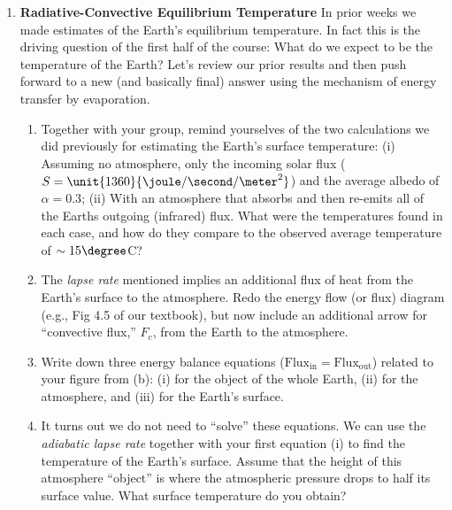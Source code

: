 \documentclass[12pt]{article}
\begin{document}
\begin{enumerate}
\item {\bf Radiative-Convective Equilibrium Temperature} In prior weeks we made estimates of the Earth's equilibrium temperature.  In fact this is the driving question of the first half of the course: What do we expect to be the temperature of the Earth?  Let's review our prior results and then push forward to a new (and basically final) answer using the mechanism of energy transfer by evaporation.
	\begin{enumerate}
	\item Together with your group, remind yourselves of the two calculations we did previously for estimating the Earth's surface temperature: (i) Assuming no atmosphere, only the incoming solar flux ($S = \unit{1360}{\joule/\second/\meter^2}$) and the average albedo of $\alpha=0.3$; (ii) With an atmosphere that absorbs and then re-emits all of the Earths outgoing (infrared) flux.  What were the temperatures found in each case, and how do they compare to the observed average temperature of $\sim15\degree$C?
	\item The {\em lapse rate} mentioned implies an additional flux of heat from the Earth's surface to the atmosphere.  Redo the energy flow (or flux) diagram (e.g., Fig 4.5 of our textbook), but now include an additional arrow for ``convective flux,'' $F_c$, from the Earth to the atmosphere.
	\item Write down three energy balance equations ($\text{Flux}_\text{in} = \text{Flux}_\text{out}$) related to your figure from (b): (i) for the object of the whole Earth, (ii) for the atmosphere, and (iii) for the Earth's surface.
	\item It turns out we do not need to ``solve'' these equations.  We can use the {\em adiabatic lapse rate} together with your first equation (i) to find the temperature of the Earth's surface.  Assume that the height of this atmosphere ``object'' is where the atmospheric pressure drops to half its surface value.  What surface temperature do you obtain?
	\end{enumerate}

\end{enumerate}

\newpage

\mbox{}
\newpage




\end{document}
